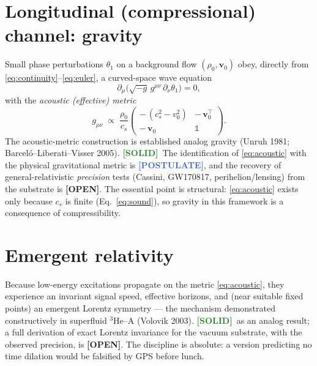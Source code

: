 \documentclass[11pt]{article}
\newcommand{\SOLID}{\textcolor{ForestGreen}{\textbf{[SOLID]}}}
\newcommand{\POSTULATE}{\textcolor{RoyalBlue}{\textbf{[POSTULATE]}}}
\newcommand{\OPENP}{\textcolor{BurntOrange}{\textbf{[OPEN]}}}
\begin{document}
\section{Longitudinal (compressional) channel: gravity}
\label{sec:gravity}
Small phase perturbations $\theta_1$ on a background flow $(\rho_0,\mathbf{v}_0)$
obey, directly from \eqref{eq:continuity}--\eqref{eq:euler}, a curved-space wave
equation
\begin{equation}
  \partial_\mu\!\big(\sqrt{-g}\,g^{\mu\nu}\,\partial_\nu\theta_1\big) = 0 ,
\end{equation}
with the \emph{acoustic (effective) metric}
\begin{equation}
  g_{\mu\nu} \;\propto\; \frac{\rho_0}{c_s}
  \begin{pmatrix}
    -\,(c_s^{2}-v_0^{2}) & -\,\mathbf{v}_0^{\top}\\[2pt]
    -\,\mathbf{v}_0 & \mathbb{1}
  \end{pmatrix}.
  \label{eq:acoustic}
\end{equation}
The acoustic-metric construction is established analog gravity (Unruh 1981;
Barcel\'o--Liberati--Visser 2005). \SOLID\ The identification of
\eqref{eq:acoustic} with the physical gravitational metric is \POSTULATE, and
the recovery of general-relativistic \emph{precision} tests (Cassini,
GW170817, perihelion/lensing) from the substrate is \OPENP. The essential point
is structural: \eqref{eq:acoustic} exists only because $c_s$ is finite
(Eq.~\eqref{eq:sound}), so gravity in this framework is a consequence of
compressibility.

\section{Emergent relativity}
Because low-energy excitations propagate on the metric \eqref{eq:acoustic}, they
experience an invariant signal speed, effective horizons, and (near suitable
fixed points) an emergent Lorentz symmetry --- the mechanism demonstrated
constructively in superfluid $^3$He--A (Volovik 2003). \SOLID\ as an analog
result; a full derivation of exact Lorentz invariance for the vacuum substrate,
with the observed precision, is \OPENP. The discipline is absolute: a version
predicting no time dilation would be falsified by GPS before lunch.
\end{document}
